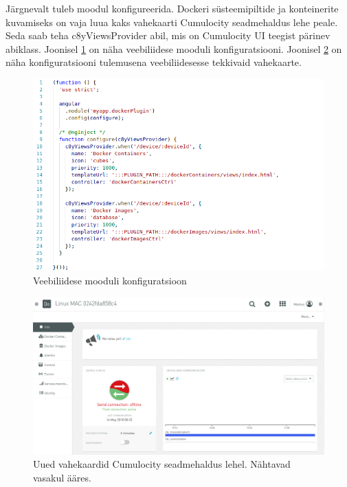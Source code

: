 \documentclass[12pt]{article}
\begin{document}
  Järgnevalt tuleb moodul konfigureerida. Dockeri süsteemipiltide ja konteinerite
  kuvamiseks on vaja luua kaks vahekaarti Cumulocity seadmehaldus lehe peale. Seda saab teha
  c8yViewsProvider abil, mis on Cumulocity UI teegist pärinev abiklass. Joonisel
  \ref{fig:webplugin_config} on näha veebiliidese mooduli konfiguratsiooni. Joonisel
  \ref{fig:webplugin_new_tabs}  on näha konfiguratsiooni tulemusena veebiliidesesse tekkivaid
  vahekaarte.
 
  \begin{figure} [ht] %
  \begin{center}
  \includegraphics[width=1.0\textwidth]{webplugin_config}
  \caption{Veebiliidese mooduli konfiguratsioon}
  \label{fig:webplugin_config}
  \end{center}
  \end{figure}
  
  \FloatBarrier
 
  \begin{figure} [ht] %
  \begin{center}
  \includegraphics[width=1\textwidth]{webplugin_new_tabs}
  \caption{Uued vahekaardid Cumulocity seadmehaldus lehel. Nähtavad vasakul ääres.}
  \label{fig:webplugin_new_tabs}
  \end{center}
  \end{figure}
  
\end{document}
